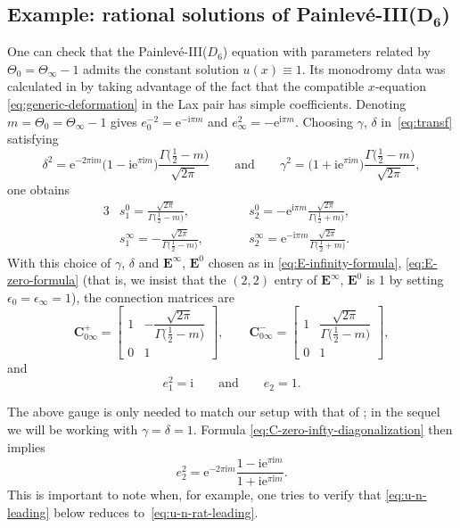 \documentclass[11pt]{article}
\numberwithin{equation}{section}
\numberwithin{equation}{section}
\newcommand{\ee}{\mathrm{e}}
\newcommand{\ii}{\mathrm{i}}
\begin{document}
\subsection[Example: rational solutions of Painlev\'e-III(D\_6)]{Example: rational solutions of Painlev\'e-III($\boldsymbol{D_6}$)}\label{sec:rational-solutions-parameters}
One can check that the Painlev\'e-III($D_6$) equation with parameters related by $\Theta_0=\Theta_\infty-1$ admits the constant solution $u(x)\equiv 1$. Its monodromy data was calculated in \cite[Section 4]{BMS18} by taking advantage of the fact that the compatible $x$-equation \eqref{eq:generic-deformation} in the Lax pair has simple coefficients. Denoting $m=\Theta_0=\Theta_\infty-1$ gives $e_0^{-2}=\ee^{-\ii\pi m}$ and $e_\infty^2=-\ee^{\ii\pi m}$. Choosing $\gamma$, $\delta$ in~\eqref{eq:transf} satisfying
\[ %
\delta^2 = \ee^{-2\pi \ii m} \big(1 - \ii \ee^{\pi \ii m}\big)\dfrac{\Gamma\big(\frac{1}{2} - m\big)}{\sqrt{2\pi}} \qquad \text{and} \qquad \gamma^2 = \big(1 + \ii \ee^{\pi \ii m}\big)\dfrac{\Gamma\big(\frac{1}{2} - m\big)}{\sqrt{2\pi}},
\]
one obtains
 \begin{alignat*}{3}
& s^0_1=\frac{\sqrt{2\pi}}{\Gamma\big(\tfrac{1}{2}-m\big)},\qquad&&
 s^0_2=-\ee^{\ii\pi m}\frac{\sqrt{2\pi}}{\Gamma\big(\tfrac{1}{2}+m\big)},&\\
& s^\infty_1=-\frac{\sqrt{2\pi}}{\Gamma\big(\tfrac{1}{2}-m\big)},\qquad&&
 s^\infty_2=\ee^{-\ii\pi m}\frac{\sqrt{2\pi}}{\Gamma\big(\tfrac{1}{2}+m\big)}.&
 \end{alignat*}
 With this choice of $\gamma$, $\delta$ and $\mathbf{E}^\infty$, $\mathbf{E}^0$ chosen as in \eqref{eq:E-infinity-formula}, \eqref{eq:E-zero-formula} (that is, we insist that the $(2,2)$ entry of $\mathbf{E}^\infty$, $\mathbf{E}^0$ is 1 by setting $\epsilon_0 = \epsilon_\infty = 1$), the connection matrices are
 \begin{equation*}
 \mathbf{C}_{0\infty}^+=\begin{bmatrix}1&-\dfrac{\sqrt{2\pi}}{\Gamma\big(\tfrac{1}{2}-m\big)} \\0&1\end{bmatrix},\qquad\mathbf{C}_{0\infty}^-=\begin{bmatrix}1&\dfrac{\sqrt{2\pi}}{\Gamma\big(\tfrac{1}{2}-m\big)} \\0&1\end{bmatrix},
 \end{equation*}
 and
 \begin{equation*}
 e_1^2=\ii \qquad \text{and} \qquad e_2 = 1.
 \end{equation*}
\begin{Remark}
 The above gauge is only needed to match our setup with that of \cite{BMS18}; in the sequel we will be working with $\gamma = \delta = 1$. Formula \eqref{eq:C-zero-infty-diagonalization} then implies
 \[
 e_2^2 = \ee^{-2\pi \ii m}\dfrac{1 - \ii \ee^{\pi \ii m}}{1 + \ii \ee^{\pi \ii m}}.
 \]
 This is important to note when, for example, one tries to verify that \eqref{eq:u-n-leading} below reduces to~\eqref{eq:u-n-rat-leading}.
\end{Remark}
\end{document}

